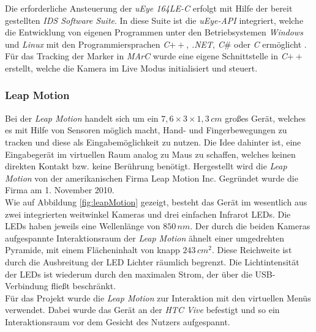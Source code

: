 Die erforderliche Ansteuerung der \textit{uEye 164LE-C} erfolgt mit Hilfe der bereit gestellten \textit{IDS Software Suite}. In diese Suite ist die \textit{uEye-API} integriert, welche die Entwicklung von eigenen Programmen unter den Betriebsystemen \textit{Windows} und \textit{Linux} mit den Programmiersprachen \textit{C}$++$, \textit{.NET}, \textit{C$\#$} oder \textit{C} ermöglicht \cite{website:IDSSuite}. Für das Tracking der Marker in \textit{MArC} wurde eine eigene Schnittstelle in \textit{C}$++$ erstellt, welche die Kamera im Live Modus initialisiert und steuert. 

\subsubsection{Leap Motion}\label{sec:LeapMotion} 	
Bei der \textit{Leap Motion} \cite{website:LeapMotion} handelt sich um ein $7,6\times3\times1,3\,cm$ großes Gerät, welches es mit Hilfe von Sensoren möglich macht, Hand- und Fingerbewegungen zu tracken und diese als Eingabemöglichkeit zu nutzen. Die Idee dahinter ist, eine Eingabegerät im virtuellen Raum analog zu Maus zu schaffen, welches keinen direkten Kontakt bzw. keine Berührung benötigt. Hergestellt wird die \textit{Leap Motion} von der amerikanischen Firma Leap Motion Inc. Gegründet wurde die Firma am 1. November 2010. \\
Wie auf Abbildung \ref{fig:leapMotion} gezeigt, besteht das Gerät im wesentlich aus zwei integrierten weitwinkel Kameras und drei einfachen Infrarot LEDs. Die LEDs haben jeweils eine Wellenlänge von $850\,nm$. Der durch die beiden Kameras aufgespannte Interaktionsraum der \textit{Leap Motion} ähnelt einer umgedrehten Pyramide, mit einem Flächeninhalt von knapp $243\,cm{^2}$. Diese Reichweite ist durch die Ausbreitung der LED Lichter räumlich begrenzt. Die Lichtintensität der LEDs ist wiederum durch den maximalen Strom, der über die USB-Verbindung fließt beschränkt.\\
Für das Projekt wurde die \textit{Leap Motion} zur Interaktion mit den virtuellen Menüs verwendet. Dabei wurde das Gerät an der \textit{HTC Vive} befestigt und so ein Interaktionsraum vor dem Gesicht des Nutzers aufgespannt.

